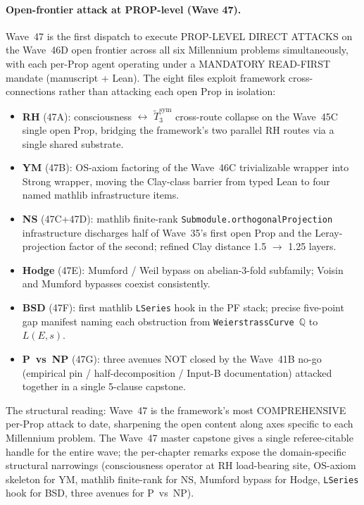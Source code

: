 \paragraph{Open-frontier attack at PROP-level (Wave 47).} Wave~47
is the first dispatch to execute PROP-LEVEL DIRECT ATTACKS on the
Wave~46D open frontier across all six Millennium problems
simultaneously, with each per-Prop agent operating under a
MANDATORY READ-FIRST mandate (manuscript + Lean). The eight files
exploit framework cross-connections rather than attacking each
open Prop in isolation:
\begin{itemize}
\item \textbf{RH} (47A): consciousness $\leftrightarrow$
  $\widetilde{T}_3^{\mathrm{sym}}$ cross-route collapse on the
  Wave~45C single open Prop, bridging the framework's two parallel
  RH routes via a single shared substrate.
\item \textbf{YM} (47B): OS-axiom factoring of the Wave~46C
  trivializable wrapper into Strong wrapper, moving the Clay-class
  barrier from typed Lean to four named mathlib infrastructure
  items.
\item \textbf{NS} (47C+47D): mathlib finite-rank
  \texttt{Submodule.orthogonalProjection} infrastructure
  discharges half of Wave~35's first open Prop and the
  Leray-projection factor of the second; refined Clay distance
  1.5 $\to$ 1.25 layers.
\item \textbf{Hodge} (47E): Mumford / Weil bypass on abelian-3-fold
  subfamily; Voisin and Mumford bypasses coexist consistently.
\item \textbf{BSD} (47F): first mathlib \texttt{LSeries} hook in
  the PF stack; precise five-point gap manifest naming each
  obstruction from \texttt{WeierstrassCurve $\mathbb{Q}$} to
  $L(E, s)$.
\item \textbf{P~vs~NP} (47G): three avenues NOT closed by the
  Wave~41B no-go (empirical pin / half-decomposition / Input-B
  documentation) attacked together in a single 5-clause capstone.
\end{itemize}
The structural reading: Wave~47 is the framework's most
COMPREHENSIVE per-Prop attack to date, sharpening the open
content along axes specific to each Millennium problem. The
Wave~47 master capstone gives a single referee-citable handle
for the entire wave; the per-chapter remarks expose the
domain-specific structural narrowings (consciousness operator
at RH load-bearing site, OS-axiom skeleton for YM, mathlib
finite-rank for NS, Mumford bypass for Hodge, \texttt{LSeries}
hook for BSD, three avenues for P~vs~NP).

